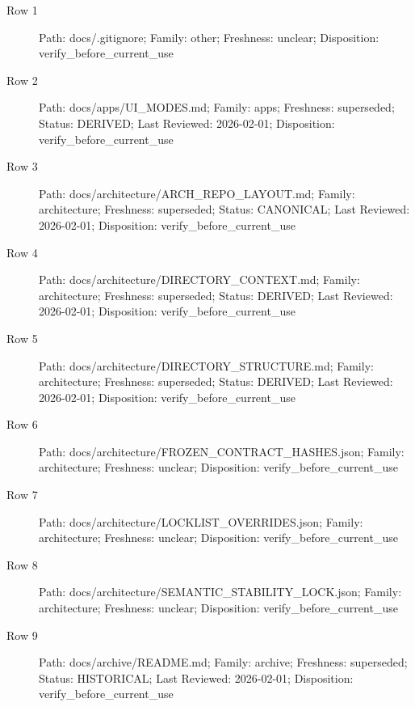 \documentclass[10.5pt,a4paper,openany]{book}
\begin{document}
\begin{description}
\item[Row 1] Path: docs/\allowbreak{}.\allowbreak{}gitignore; Family: other; Freshness: unclear; Disposition: verify\_\allowbreak{}before\_\allowbreak{}current\_\allowbreak{}use
\item[Row 2] Path: docs/\allowbreak{}apps/\allowbreak{}UI\_\allowbreak{}MODES.\allowbreak{}md; Family: apps; Freshness: superseded; Status: DERIVED; Last Reviewed: 2026-\allowbreak{}02-\allowbreak{}01; Disposition: verify\_\allowbreak{}before\_\allowbreak{}current\_\allowbreak{}use
\item[Row 3] Path: docs/\allowbreak{}architecture/\allowbreak{}ARCH\_\allowbreak{}REPO\_\allowbreak{}LAYOUT.\allowbreak{}md; Family: architecture; Freshness: superseded; Status: CANONICAL; Last Reviewed: 2026-\allowbreak{}02-\allowbreak{}01; Disposition: verify\_\allowbreak{}before\_\allowbreak{}current\_\allowbreak{}use
\item[Row 4] Path: docs/\allowbreak{}architecture/\allowbreak{}DIRECTORY\_\allowbreak{}CONTEXT.\allowbreak{}md; Family: architecture; Freshness: superseded; Status: DERIVED; Last Reviewed: 2026-\allowbreak{}02-\allowbreak{}01; Disposition: verify\_\allowbreak{}before\_\allowbreak{}current\_\allowbreak{}use
\item[Row 5] Path: docs/\allowbreak{}architecture/\allowbreak{}DIRECTORY\_\allowbreak{}STRUCTURE.\allowbreak{}md; Family: architecture; Freshness: superseded; Status: DERIVED; Last Reviewed: 2026-\allowbreak{}02-\allowbreak{}01; Disposition: verify\_\allowbreak{}before\_\allowbreak{}current\_\allowbreak{}use
\item[Row 6] Path: docs/\allowbreak{}architecture/\allowbreak{}FROZEN\_\allowbreak{}CONTRACT\_\allowbreak{}HASHES.\allowbreak{}json; Family: architecture; Freshness: unclear; Disposition: verify\_\allowbreak{}before\_\allowbreak{}current\_\allowbreak{}use
\item[Row 7] Path: docs/\allowbreak{}architecture/\allowbreak{}LOCKLIST\_\allowbreak{}OVERRIDES.\allowbreak{}json; Family: architecture; Freshness: unclear; Disposition: verify\_\allowbreak{}before\_\allowbreak{}current\_\allowbreak{}use
\item[Row 8] Path: docs/\allowbreak{}architecture/\allowbreak{}SEMANTIC\_\allowbreak{}STABILITY\_\allowbreak{}LOCK.\allowbreak{}json; Family: architecture; Freshness: unclear; Disposition: verify\_\allowbreak{}before\_\allowbreak{}current\_\allowbreak{}use
\item[Row 9] Path: docs/\allowbreak{}archive/\allowbreak{}README.\allowbreak{}md; Family: archive; Freshness: superseded; Status: HISTORICAL; Last Reviewed: 2026-\allowbreak{}02-\allowbreak{}01; Disposition: verify\_\allowbreak{}before\_\allowbreak{}current\_\allowbreak{}use

\end{description}
\end{document}
